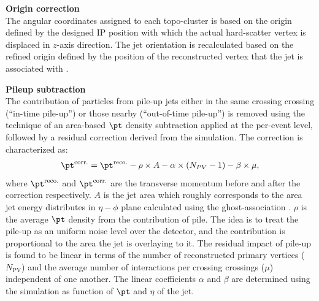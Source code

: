 \begin{description}
\item \textbf{Origin correction} \\
The angular coordinates assigned to each topo-cluster is based on the origin defined by the designed IP position with which the actual hard-scatter vertex is displaced in $z$-axis direction. The jet orientation is recalculated based on the refined origin defined by the position of the reconstructed vertex that the jet is associated with \cite{JESmeas_unct_Run1_inclOC}. \\


\item \textbf{Pileup subtraction} \\
The contribution of particles from pile-up jets either in the same crossing crossing (``in-time pile-up'') or those nearby (``out-of-time pile-up'') is removed using the technique of an area-based $\pt$ density subtraction \cite{145_areaBasedPUsub} applied at the per-event level, followed by a residual correction derived from the simulation. The correction is characterized as:
\begin{align}
\pt^{\mathrm{corr.}} = \pt^{\mathrm{reco.}} - \rho \times A - \alpha  \times (N_{PV}-1) - \beta \times \mu,
\label{eq::PUresidual}
\end{align}
where $\pt^{\mathrm{reco.}}$ and $\pt^{\mathrm{corr.}}$ are the transverse momentum before and after the correction respectively. $A$ is the jet area which roughly corresponds to the area jet energy distributes in $\eta-\phi$ plane calculated using the ghost-association \cite{143_JetFindingReview}. $\rho$ is the average $\pt$ density from the contribution of pile. The idea is to treat the pile-up as an uniform noise level over the detector, and the contribution is proportional to the area the jet is overlaying to it. 
The residual impact of pile-up is found to be linear in terms of the number of reconstructed primary vertices ($N_{\mathrm{PV}}$) and the average number of interactions per crossing crossings ($\mu$) independent of one another.
The linear coefficients $\alpha$ and $\beta$ are determined using the simulation as function of $\pt$ and $\eta$ of the jet.





\end{description}
